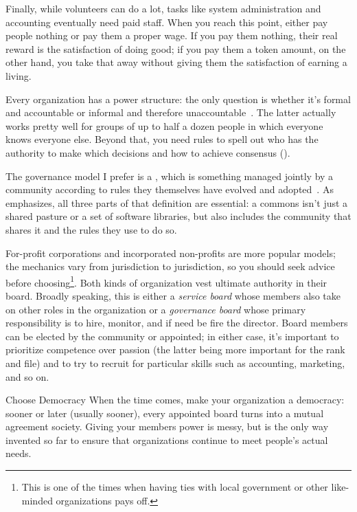 Finally, 
while volunteers can do a lot,
tasks like system administration and accounting eventually need paid staff.
When you reach this point,
either pay people nothing or pay them a proper wage.
If you pay them nothing,
their real reward is the satisfaction of doing good;
if you pay them a token amount,
on the other hand,
you take that away without giving them the satisfaction of earning a living.


Every organization has a power structure:
the only question is
whether it's formal and accountable or informal and therefore unaccountable~\cite{Free1972}.
The latter actually works pretty well for groups of up to half a dozen people
in which everyone knows everyone else.
Beyond that,
you need rules to spell out
who has the authority to make which decisions
and how to achieve consensus ().

The governance model I prefer is a ,
which is something managed jointly by a community
according to rules they themselves have evolved and adopted~\cite{Ostr2015}.
As~\cite{Boll2014} emphasizes,
all three parts of that definition are essential:
a commons isn't just a shared pasture or a set of software libraries,
but also includes the community that shares it
and the rules they use to do so.

For-profit corporations and incorporated non-profits are more popular models;
the mechanics vary from jurisdiction to jurisdiction,
so you should seek advice before choosing\footnote{This is one of the times when
  having ties with local government or other like-minded organizations pays off.}.
Both kinds of organization vest ultimate authority in their board.
Broadly speaking, this is either a \emph{service board}
whose members also take on other roles in the organization
or a \emph{governance board} whose primary responsibility is to hire, monitor,
and if need be fire the director.
Board members can be elected by the community or appointed;
in either case,
it's important to prioritize competence over passion
(the latter being more important for the rank and file)
and to try to recruit for particular skills such as accounting, marketing, and so on.

\begin{aside}{Choose Democracy}
  When the time comes,
  make your organization a democracy:
  sooner or later (usually sooner),
  every appointed board turns into a mutual agreement society.
  Giving your members power is messy,
  but is the only way invented so far to ensure that
  organizations continue to meet people's actual needs.
\end{aside}


